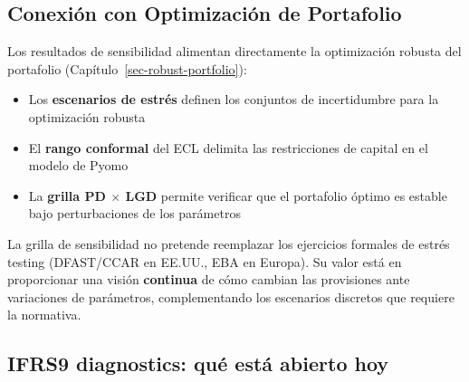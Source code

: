 \documentclass[
  spanish,
  11pt,
  letterpaper,
]{scrbook}
\providecommand{\tightlist}{%
  \setlength{\itemsep}{0pt}\setlength{\parskip}{0pt}}
\theoremstyle{plain}
\theoremstyle{remark}
\begin{document}
\subsection{Conexión con Optimización de
Portafolio}\label{conexiuxf3n-con-optimizaciuxf3n-de-portafolio}

Los resultados de sensibilidad alimentan directamente la optimización
robusta del portafolio (Capítulo~\ref{sec-robust-portfolio}):

\begin{itemize}
\tightlist
\item
  Los \textbf{escenarios de estrés} definen los conjuntos de
  incertidumbre para la optimización robusta
\item
  El \textbf{rango conformal} del ECL delimita las restricciones de
  capital en el modelo de Pyomo
\item
  La \textbf{grilla PD \(\times\) LGD} permite verificar que el
  portafolio óptimo es estable bajo perturbaciones de los parámetros
\end{itemize}

\begin{tcolorbox}[enhanced jigsaw, arc=.35mm, bottomrule=.15mm, bottomtitle=1mm, breakable, colback=white, colbacktitle=quarto-callout-tip-color!10!white, colframe=quarto-callout-tip-color-frame, coltitle=black, left=2mm, leftrule=.75mm, opacityback=0, opacitybacktitle=0.6, rightrule=.15mm, title=\textcolor{quarto-callout-tip-color}{\faLightbulb}\hspace{0.5em}{Lectura para Estrés Testing}, titlerule=0mm, toprule=.15mm, toptitle=1mm]

La grilla de sensibilidad no pretende reemplazar los ejercicios formales
de estrés testing (DFAST/CCAR en EE.UU., EBA en Europa). Su valor está
en proporcionar una visión \textbf{continua} de cómo cambian las
provisiones ante variaciones de parámetros, complementando los
escenarios discretos que requiere la normativa.

\end{tcolorbox}

\subsection{IFRS9 diagnostics: qué está abierto
hoy}\label{ifrs9-diagnostics-quuxe9-estuxe1-abierto-hoy}
\end{document}
